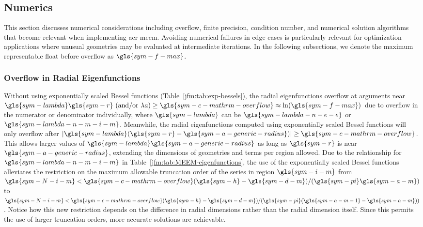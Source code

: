 \documentclass[ASNA,twocolumn]{USG} %
\begin{document}

\subsection{Numerics}\label{jfm:sec:numerics}
This section discusses numerical considerations including overflow, finite precision, condition number, and numerical solution algorithms that become relevant when implementing \gls{acr-meem}. 
Avoiding numerical failures in edge cases is particularly relevant for optimization applications where unusual geometries may be evaluated at intermediate iterations.
In the following subsections, we denote the maximum representable float before overflow as $\gls{sym-f-max}$.


\subsubsection{Overflow in Radial Eigenfunctions}
Without using exponentially scaled Bessel functions (Table~\ref{jfm:tab:exp-bessels}), the radial eigenfunctions overflow at arguments near $\gls{sym-lambda} \gls{sym-r} \text{ (and/or $\lambda a$)}\geq \gls{sym-c-mathrm-overflow} \approx \ln(\gls{sym-f-max})$ due to overflow in the numerator or denominator individually, where $\gls{sym-lambda}$ can be $\gls{sym-lambda-n-e-e}$ or $\gls{sym-lambda-n-m-i-m}$.
Meanwhile, the radial eigenfunctions computed using exponentially scaled Bessel functions will only overflow after $|\gls{sym-lambda} (\gls{sym-r} - \gls{sym-a-generic-radius})|\geq \gls{sym-c-mathrm-overflow}$.
This allows larger values of $\gls{sym-lambda} \gls{sym-a-generic-radius}$ as long as $\gls{sym-r}$ is near $\gls{sym-a-generic-radius}$, extending the dimensions of geometries and terms per region allowed.
Due to the relationship for $\gls{sym-lambda-n-m-i-m}$ in Table~\ref{jfm:tab:MEEM-eigenfunctions}, the use of the exponentially scaled Bessel functions alleviates the restriction on the maximum allowable truncation order of the series in region $\gls{sym-i-m}$ from $\gls{sym-N-i-m} < \gls{sym-c-mathrm-overflow}(\gls{sym-h}-\gls{sym-d-m}) / (\gls{sym-pi} \gls{sym-a-m})$ to $\gls{sym-N-i-m} < \gls{sym-c-mathrm-overflow}(\gls{sym-h}-\gls{sym-d-m}) / (\gls{sym-pi}(\gls{sym-a-m-1} - \gls{sym-a-m}))$.
Notice how this new restriction depends on the difference in radial dimensions rather than the radial dimension itself.
Since this permits the use of larger truncation orders, more accurate solutions are achievable.
\end{document}
